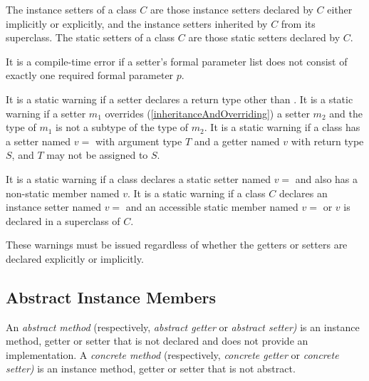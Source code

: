 \documentclass{article}
\begin{document}

\LMHash{}
The instance setters of a class $C$ are those instance setters declared by $C$ either implicitly or explicitly, and the instance setters inherited by $C$ from its superclass. The static setters of a class $C$ are those static setters declared by $C$.

\LMHash{}
It is a compile-time error if a setter's formal parameter list does not consist of exactly one required formal parameter $p$.  


\LMHash{}
It is a static warning if a setter declares a return type other than \VOID{}.
It is a static warning if a setter $m_1$ overrides  (\ref{inheritanceAndOverriding}) a setter $m_2$ and the type of $m_1$ is not a subtype of the type of $m_2$. It is a static warning if a class has a setter named $v=$ with argument type $T$ and a getter named $v$ with return type $S$, and $T$ may not be assigned to $S$.

\LMHash{}
It is a static warning if a class  declares a static setter named $v=$ and also has a non-static member named $v$. It is a static warning if a class $C$ declares an instance setter named $v=$ and an accessible static member named $v=$ or $v$ is declared in a superclass of $C$.

\LMHash{}
These warnings must be issued regardless of whether the getters or setters are declared explicitly or implicitly.

\subsection{Abstract Instance Members}

\LMHash{}
An {\em abstract method} (respectively, {\em abstract getter} or {\em abstract setter)} is an instance method, getter or setter that is not declared \EXTERNAL{} and does not  provide an implementation. A {\em concrete method} (respectively, {\em concrete getter} or {\em concrete setter)} is an instance method, getter or setter that is not abstract.
\end{document}
